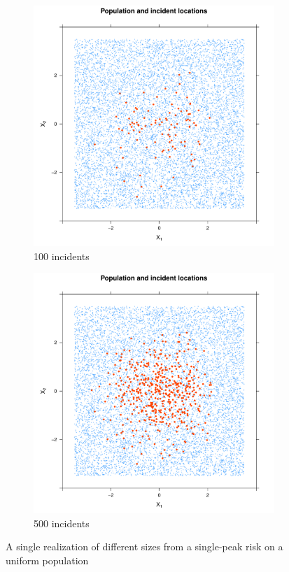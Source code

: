 \begin{figure}[htbp]
    \centering
    \begin{subfigure}{0.45\textwidth}
    \includegraphics[width=\textwidth]{results/unif_100_1.0_1h/output/population_and_incidents_scatter}
    \caption{100 incidents}
    \end{subfigure}
    \begin{subfigure}{0.45\textwidth}
    \includegraphics[width=\textwidth]{results/unif_500_1.0_1h/output/population_and_incidents_scatter}
    \caption{500 incidents}
    \end{subfigure}
    \caption{A single realization of different sizes from a single-peak risk on a uniform population}
    \label{fig:one_sample:unif_NCases_1h}
\end{figure}

